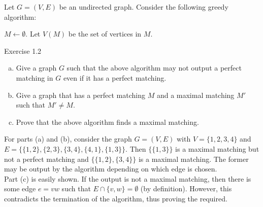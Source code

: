 	\begin{exercise}
		Let $G=(V,E)$ be an undirected graph. Consider the following greedy algorithm:
		\begin{algorithm*}
			\DontPrintSemicolon
			\SetNoFillComment
			$M\gets\emptyset$. Let $V(M)$ be the set of vertices in $M$.\;
			\caption{Exercise 1.2}\label{algo: ex 1.2}
		\end{algorithm*}

		\begin{enumerate}[(a)]
			\item Give a graph $G$ such that the above algorithm may not output a perfect matching in $G$ even if it has a perfect matching.
			\item Give a graph that has a perfect matching $M$ and a maximal matching $M'$ such that $M'\neq M$.
			\item Prove that the above algorithm finds a maximal matching.
		\end{enumerate}
	\end{exercise}
	\begin{solution*}
		For parts (a) and (b), consider the graph $G=(V,E)$ with $V=\{1,2,3,4\}$ and $E=\{\{1,2\},\{2,3\},\{3,4\},\{4,1\},\{1,3\}\}$. Then $\{\{1,3\}\}$ is a maximal matching but not a perfect matching and $\{\{1,2\},\{3,4\}\}$ is a maximal matching. The former may be output by the algorithm depending on which edge is chosen.\\
		Part (c) is easily shown. If the output is not a maximal matching, then there is some edge $e=vw$ such that $E\cap\{v,w\}=\emptyset$ (by definition). However, this contradicts the termination of the algorithm, thus proving the required.
	\end{solution*}

